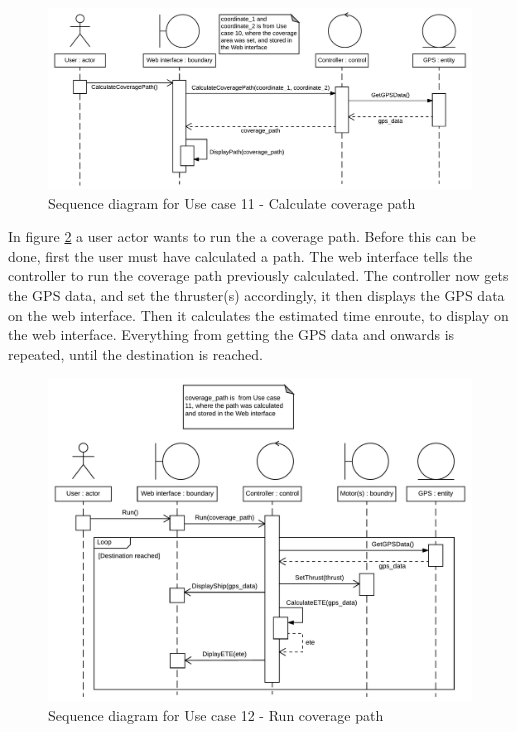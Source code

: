 \begin{figure}[H]
	\centering
	\includegraphics[width=1\linewidth]{Images/System_architecture/Use_case_11_SD}
	\caption{Sequence diagram for Use case 11 - Calculate coverage path}
	\label{fig:seq:uc11}
\end{figure}

In figure \ref{fig:seq:uc12} a user actor wants to run the a coverage path. Before this can be done, first the user must have calculated a path. The web interface tells the controller to run the coverage path previously calculated. The controller now gets the GPS data, and set the thruster(s) accordingly, it then displays the GPS data on the web interface. Then it calculates the estimated time enroute, to display on the web interface. Everything from getting the GPS data and onwards is repeated, until the destination is reached.

\begin{figure}[H]
	\centering
	\includegraphics[width=1\linewidth]{Images/System_architecture/Use_case_12_SD}
	\caption{Sequence diagram for Use case 12 - Run coverage path}
	\label{fig:seq:uc12}
\end{figure}

